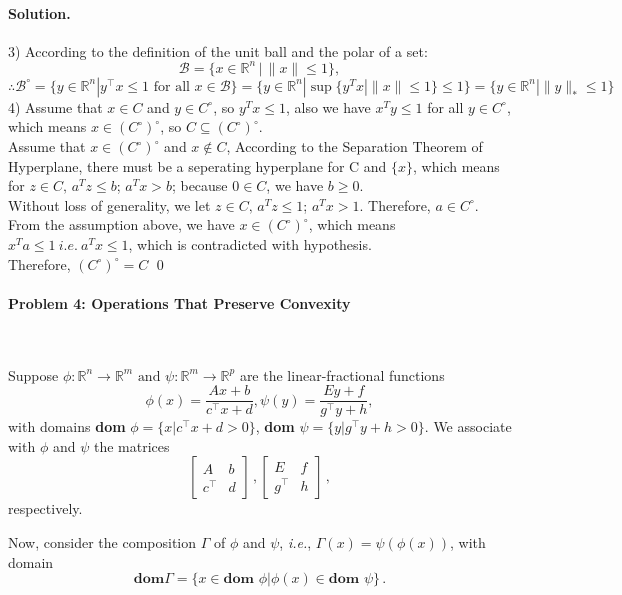 \documentclass[a4paper]{article}
\newenvironment{solution}
{\color{blue} \paragraph{Solution.}}
{\newline \qed}
\begin{document}
\begin{solution}
3) According to the definition of the unit ball and the polar of a set:
$$\mathcal{B} = \{x \in \mathbb{R}^n\,|\,\|x\|\leq 1 \},$$
$$\therefore\mathcal{B}^\circ = \{ y\in \mathbb{R}^n | y^\top x\leq 1 \text{ for all }x \in \mathcal{B}\}=\{ y\in \mathbb{R}^n |\sup \{y^Tx | \|x\| \leq 1\}\leq 1\}=\{  y\in \mathbb{R}^n | \|y\|_* \leq 1\}$$
4) Assume that $x \in C$ and $y \in C^\circ$, so $y^Tx \leq 1$, also we have $x^Ty \leq 1$ for all $y \in C^\circ$, which means $x \in (C^\circ)^\circ$, so $C \subseteq (C^\circ)^\circ$.\\
Assume that $x \in (C^\circ)^\circ$ and $x \not\in C$, According to the Separation Theorem of Hyperplane, there must be a seperating hyperplane for C and $\{x\}$, which means for $z \in C,\,a^Tz \leq b$; $a^Tx > b$; because $0 \in C$, we have $b \geq 0$.\\
Without loss of generality, we let  $z \in C,\,a^Tz \leq 1$; $a^Tx > 1$. Therefore, $a \in C^\circ$. From the assumption above, we have $x \in (C^\circ)^\circ$, which means $x^Ta \leq 1\ i.e.\ a^Tx \leq 1$, which is contradicted with hypothesis.\\ Therefore,  $(C^\circ)^\circ = C$
\end{solution}

\paragraph{Problem 4: Operations That Preserve Convexity}
~

Suppose $\phi : \mathbb{R}^n \rightarrow \mathbb{R}^m \text{ and } \psi : \mathbb{R}^m \rightarrow \mathbb{R}^p$ are the linear-fractional functions
\begin{equation}
\phi(x) = \frac{Ax+b}{c^\top x + d}, \psi(y) = \frac{Ey+f}{g^\top y + h},
\end{equation}
with domains \textbf{dom }$\phi = \{ x | c^\top x + d > 0 \}$, \textbf{dom }$\psi = \{ y | g^\top y + h > 0 \}$. We associate with $\phi$ and $\psi$ the matrices
\begin{equation}
  \left[\begin{matrix}
   A & b \\
   c^\top & d
  \end{matrix}\right]\,,
  \left[\begin{matrix}
   E & f \\
   g^\top & h
  \end{matrix}\right]\,,
\end{equation}
respectively.

Now, consider the composition $\Gamma$ of $\phi$ and $\psi$, \emph{i.e.}, $\Gamma(x)=\psi(\phi(x))$, with domain
\begin{equation}
\textbf{dom} \Gamma = \{ x \in \textbf{dom } \phi | \phi(x) \in \textbf{dom } \psi\} \,.
\end{equation}
\end{document}
